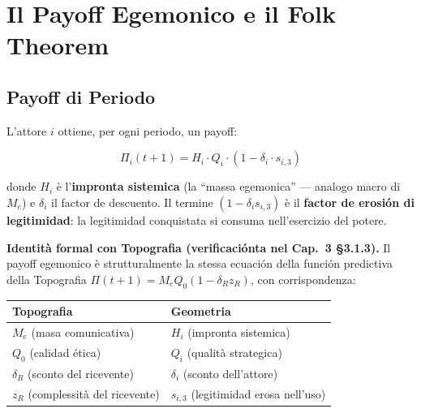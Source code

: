 \section{Il Payoff Egemonico e il Folk
Theorem}\label{il-payoff-egemonico-e-il-folk-theorem}

\subsection{Payoff di Periodo}\label{payoff-di-periodo}

L'attore \(i\) ottiene, per ogni periodo, un payoff:

\[
\Pi_i(t+1) = H_i \cdot Q_i \cdot (1 - \delta_i \cdot s_{i,3})
\]

donde \(H_i\) è l'\textbf{impronta sistemica} (la ``massa egemonica'' ---
analogo macro di \(M_e\)) e \(\delta_i\) il factor de descuento. Il
termine \((1 - \delta_i s_{i,3})\) è il \textbf{factor de erosión di
legitimidad}: la legitimidad conquistata si consuma nell'esercizio del
potere.

\Proved{} \textbf{Identità formal con Topografia (verificaciónta nel Cap.~3
\S{}3.1.3).} Il payoff egemonico è strutturalmente la stessa ecuación
della función predictiva della Topografia
\(\Pi(t+1) = M_e Q_0 (1 - \delta_R z_R)\), con corrispondenza:

{\def\LTcaptype{none} %
{\small\begin{longtable}[]{@{}
  >{\raggedright\arraybackslash}p{}
  >{\raggedright\arraybackslash}p{}@{}}
\toprule\noalign{}
\begin{minipage}[b]{\linewidth}\raggedright
Topografia
\end{minipage} & \begin{minipage}[b]{\linewidth}\raggedright
Geometria
\end{minipage} \\
\midrule\noalign{}
\endhead
\bottomrule\noalign{}
\endlastfoot
\(M_e\) (masa comunicativa) & \(H_i\) (impronta sistemica) \\
\(Q_0\) (calidad ética) & \(Q_i\) (qualità strategica) \\
\(\delta_R\) (sconto del ricevente) & \(\delta_i\) (sconto
dell'attore) \\
\(z_R\) (complessità del ricevente) & \(s_{i,3}\) (legitimidad erosa
nell'uso) \\
\end{longtable}}
}

